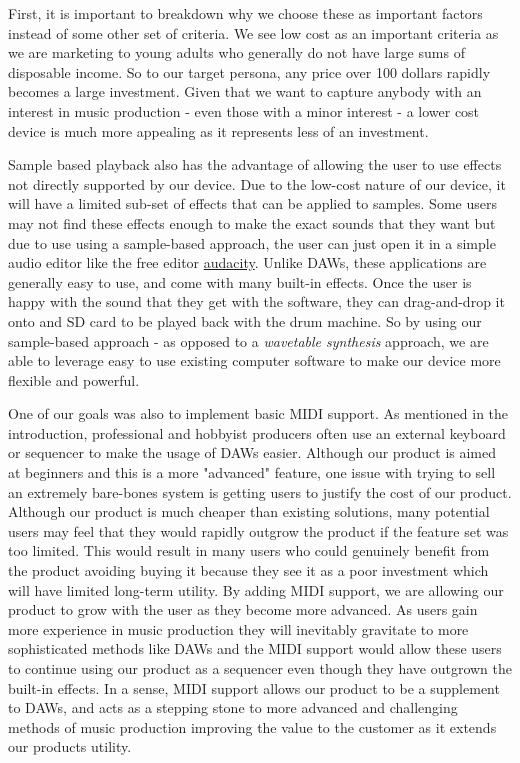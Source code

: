 \documentclass[11pt]{article}
\begin{document}
First, it is important to breakdown why we choose these as important
factors instead of some other set of criteria. We see low cost as an
important criteria as we are marketing to young adults who generally
do not have large sums of disposable income. So to our target persona,
any price over 100 dollars rapidly becomes a large investment. Given that
we want to capture anybody with an interest in music production - even
those with a minor interest - a lower cost device is much more appealing
as it represents less of an investment.

Sample based playback also has the advantage of allowing the user to
use effects not directly supported by our device. Due to the low-cost
nature of our device, it will have a limited sub-set of effects that
can be applied to samples. Some users may not find these effects
enough to make the exact sounds that they want but due to use using a
sample-based approach, the user can just open it in a simple audio
editor like the free editor \href{https://www.audacityteam.org/}{audacity}. Unlike DAWs, these applications
are generally easy to use, and come with many built-in effects. Once
the user is happy with the sound that they get with the software, they
can drag-and-drop it onto and SD card to be played back with the drum
machine. So by using our sample-based approach - as opposed to a
\emph{wavetable synthesis} approach, we are able to leverage easy to use
existing computer software to make our device more flexible and
powerful.

One of our goals was also to implement basic MIDI support. As
mentioned in the introduction, professional and hobbyist producers
often use an external keyboard or sequencer to make the usage of DAWs
easier.  Although our product is aimed at beginners and this is a more
"advanced" feature, one issue with trying to sell an extremely
bare-bones system is getting users to justify the cost of our
product. Although our product is much cheaper than existing solutions,
many potential users may feel that they would rapidly outgrow the
product if the feature set was too limited. This would result in many
users who could genuinely benefit from the product avoiding buying it
because they see it as a poor investment which will have limited
long-term utility. By adding MIDI support, we are allowing our product
to grow with the user as they become more advanced. As users gain more
experience in music production they will inevitably gravitate to more
sophisticated methods like DAWs and the MIDI support would allow these
users to continue using our product as a sequencer even though they
have outgrown the built-in effects. In a sense, MIDI support allows
our product to be a supplement to DAWs, and acts as a stepping stone
to more advanced and challenging methods of music production improving
the value to the customer as it extends our products utility.
\end{document}
